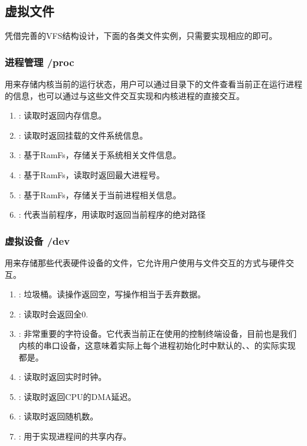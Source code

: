 \documentclass{article}
\begin{document}
\subsection{虚拟文件}
凭借完善的VFS结构设计，下面的各类文件实例，只需要实现相应的即可。

\subsubsection{进程管理 /proc}
用来存储内核当前的运行状态，用户可以通过\code{\proc}目录下的文件查看当前正在运行进程的信息，也可以通过与这些文件交互实现和内核进程的直接交互。

\begin{enumerate}
    \item {}: 读取时返回内存信息。
    \item {}: 读取时返回挂载的文件系统信息。
    \item {}: 基于RamFs，存储关于系统相关文件信息。
    \item {}: 基于RamFs，读取时返回最大进程号。
    \item {}: 基于RamFs，存储关于当前进程相关信息。
    \item {}: 代表当前程序，用读取时返回当前程序的绝对路径
\end{enumerate}

\subsubsection{虚拟设备 /dev}
用来存储那些代表硬件设备的文件，它允许用户使用与文件交互的方式与硬件交互。

\begin{enumerate}
    \item {}: 垃圾桶。读操作返回空，写操作相当于丢弃数据。
    \item {}: 读取时会返回全0.
    \item {}: 非常重要的字符设备。它代表当前正在使用的控制终端设备，目前也是我们内核的串口设备，这意味着实际上每个进程初始化时中默认的、、的实际实现都是。
    \item {}: 读取时返回实时时钟。
    \item {}: 读取时返回CPU的DMA延迟。
    \item {}: 读取时返回随机数。
    \item {}: 用于实现进程间的共享内存。
\end{enumerate}
\end{document}

